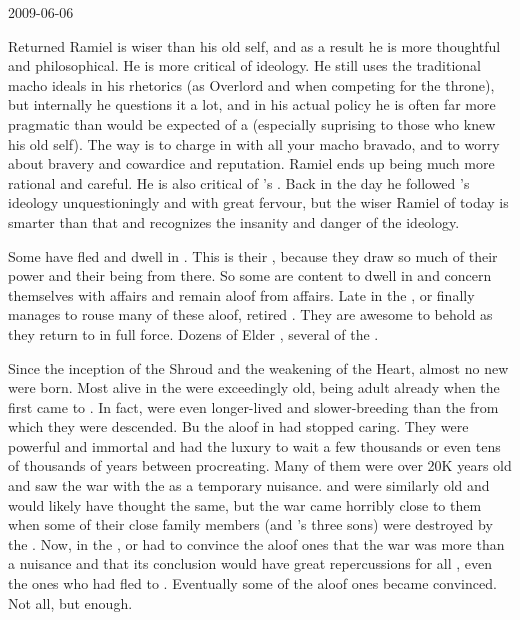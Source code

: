 2009-06-06

Returned Ramiel is wiser than his old self, and as a result he is more thoughtful and philosophical. 
He is more critical of \Mystraacht ideology. 
He still uses the traditional \Mystraacht macho ideals in his rhetorics (as Overlord and when competing for the throne), but internally he questions it a lot, and in his actual policy he is often far more pragmatic than would be expected of a \Mystraacht (especially suprising to those who knew his old self). 
The \Mystraacht way is to charge in with all your macho bravado, and to worry about bravery and cowardice and reputation. 
Ramiel ends up being much more rational and careful.
He is also critical of \Zachirah's . 
Back in the day he followed \Zachirah's ideology unquestioningly and with great fervour, but the wiser Ramiel of today is smarter than that and recognizes the insanity and danger of the ideology. 

Some \dragons have fled \Miith and dwell in \Machai. 
This is their , because they draw so much of their power and their being from there.
So some are content to dwell in \Machai and concern themselves with \Machaic affairs and remain aloof from \Miithian affairs. 
Late in the \thirdbanewar, \Secherdamon or \Ishnaruchaefir finally manages to rouse many of these aloof, retired \dragons.
They are awesome to behold as they return to \Miith in full force. 
Dozens of Elder \Dragons, several of the \shaeeroth.

Since the inception of the Shroud and the weakening of the Heart, almost no new \dragons were born.
Most \dragons alive in the \thirdbanewar were exceedingly old, being adult already when the first \resphain came to \Miith. 
In fact, \dragons were even longer-lived and slower-breeding than the \ophidians from which they were descended. 
Bu the aloof \dragons in \Machai had stopped caring.
They were powerful and immortal and had the luxury to wait a few thousands or even tens of thousands of years between procreating. Many of them were over 20K years old and saw the war with the \resphain as a temporary nuisance. 
\Ishnaruchaefir and \Secherdamon were similarly old and would likely have thought the same, but the war came horribly close to them when some of their close family members (\Nexagglachel and \Ishnaruchaefir's three sons) were destroyed by the \resphain.
Now, in the \thirdbanewar, \Secherdamon or \Ishnaruchaefir had to convince the aloof ones that the war was more than a nuisance and that its conclusion would have great repercussions for all \dragons, even the ones who had fled to \Machai.
Eventually some of the aloof ones became convinced. 
Not all, but enough.


